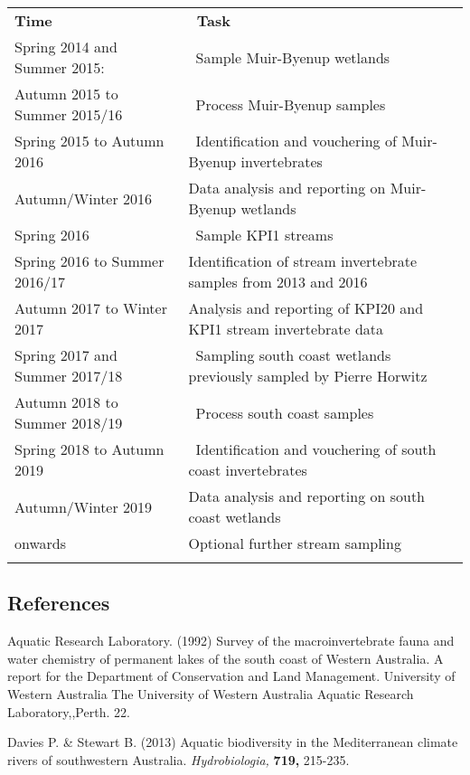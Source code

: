 \documentclass[version=last,
    paper=a4, %
    10pt, %
    usenames,
    dvipsnames,
    oneside, %
    headings=openany, %
    DIV=15 %
]{scrbook}
\begin{document}
\begin{longtable}[c]{@{}ll@{}}
\toprule\addlinespace
\textbf{Time} & \textbf{~Task}
\\\addlinespace
Spring 2014 and Summer 2015: & ~Sample Muir-Byenup wetlands
\\\addlinespace
Autumn 2015 to Summer 2015/16 & ~Process Muir-Byenup samples
\\\addlinespace
Spring 2015 to Autumn 2016 & ~Identification and vouchering of
Muir-Byenup invertebrates
\\\addlinespace
Autumn/Winter 2016 & Data analysis and reporting on Muir-Byenup wetlands
\\\addlinespace
Spring 2016 & ~Sample KPI1 streams
\\\addlinespace
Spring 2016 to Summer 2016/17 & Identification of stream invertebrate
samples from 2013 and 2016
\\\addlinespace
Autumn 2017 to Winter 2017 & Analysis and reporting of KPI20 and KPI1
stream invertebrate data
\\\addlinespace
Spring 2017 and Summer 2017/18 & ~Sampling south coast wetlands
previously sampled by Pierre Horwitz
\\\addlinespace
Autumn 2018 to Summer 2018/19 & ~Process south coast samples
\\\addlinespace
Spring 2018 to Autumn 2019 & ~Identification and vouchering of south
coast invertebrates
\\\addlinespace
Autumn/Winter 2019 & Data analysis and reporting on south coast wetlands
\\\addlinespace
2019 onwards & Optional further stream sampling
\\\addlinespace
\bottomrule
\end{longtable}



\subsection*{References}
Aquatic Research Laboratory. (1992) Survey of the macroinvertebrate
fauna and water chemistry of permanent lakes of the south coast of
Western Australia. A report for the Department of Conservation and Land
Management. University of Western Australia The University of Western
Australia Aquatic Research Laboratory,,Perth. 22.

Davies P. \& Stewart B. (2013) Aquatic biodiversity in the Mediterranean
climate rivers of southwestern Australia. \emph{Hydrobiologia,}
\textbf{719,} 215-235.
\end{document}
